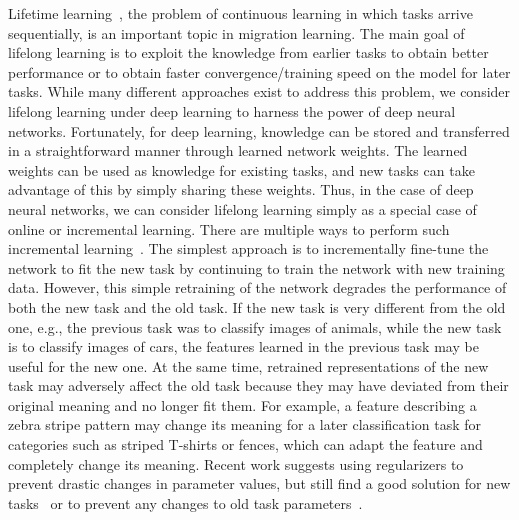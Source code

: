 Lifetime learning~\cite{thrun1995lifelong}, the problem of continuous learning in which tasks arrive sequentially, is an important topic in migration learning. The main goal of lifelong learning is to exploit the knowledge from earlier tasks to obtain better performance or to obtain faster convergence/training speed on the model for later tasks. While many different approaches exist to address this problem, we consider lifelong learning under deep learning to harness the power of deep neural networks. Fortunately, for deep learning, knowledge can be stored and transferred in a straightforward manner through learned network weights. The learned weights can be used as knowledge for existing tasks, and new tasks can take advantage of this by simply sharing these weights. Thus, in the case of deep neural networks, we can consider lifelong learning simply as a special case of online or incremental learning. There are multiple ways to perform such incremental learning~\cite{rusu2016progressive}. The simplest approach is to incrementally fine-tune the network to fit the new task by continuing to train the network with new training data. However, this simple retraining of the network degrades the performance of both the new task and the old task. If the new task is very different from the old one, e.g., the previous task was to classify images of animals, while the new task is to classify images of cars, the features learned in the previous task may be useful for the new one. At the same time, retrained representations of the new task may adversely affect the old task because they may have deviated from their original meaning and no longer fit them. For example, a feature describing a zebra stripe pattern may change its meaning for a later classification task for categories such as striped T-shirts or fences, which can adapt the feature and completely change its meaning.
Recent work suggests using regularizers to prevent drastic changes in parameter values, but still find a good solution for new tasks~\cite{kirkpatrick2017overcoming} or to prevent any changes to old task parameters~\cite{rusu2016progressive}.
